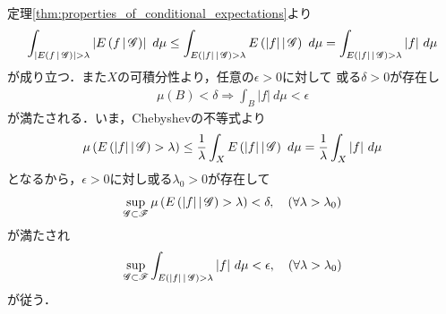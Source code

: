	\begin{prf}
		定理\ref{thm:properties_of_conditional_expectations}より
				\begin{align}
					\int_{\left| \cexp{f}{\mathscr{G}} \right| > \lambda} \left| \cexp{f}{\mathscr{G}} \right|\ d\mu
					\leq \int_{\cexp{|f|}{\mathscr{G}} > \lambda} \cexp{|f|}{\mathscr{G}}\ d\mu
					= \int_{\cexp{|f|}{\mathscr{G}} > \lambda} |f|\ d\mu
				\end{align}
				が成り立つ．また$X$の可積分性より，任意の$\epsilon > 0$に対して
				或る$\delta > 0$が存在し
				\begin{align}
					\mu(B) < \delta \Rightarrow \int_B |f|\ d\mu < \epsilon
				\end{align}
				が満たされる．いま，Chebyshevの不等式より
				\begin{align}
					\mu\left( E\left( |f| \, \middle|\, \mathscr{G} \right) > \lambda \right)
					\leq \frac{1}{\lambda} \int_X E\left( |f| \, \middle|\, \mathscr{G} \right)\ d\mu
					= \frac{1}{\lambda} \int_X |f|\ d\mu
				\end{align}
				となるから，$\epsilon > 0$に対し或る$\lambda_0 > 0$が存在して
				\begin{align}
					\operatorname*{sup}_{\mathscr{G} \subset \mathscr{F}} \mu\left( E\left( |f| \, \middle|\, \mathscr{G} \right) > \lambda \right)
					< \delta,
					\quad (\forall \lambda > \lambda_0)
				\end{align}
				が満たされ
				\begin{align}
					\operatorname*{sup}_{\mathscr{G} \subset \mathscr{F}} \int_{E\left( |f| \, \middle|\, \mathscr{G} \right) > \lambda}|f|\ d\mu
					< \epsilon,
					\quad (\forall \lambda > \lambda_0)
				\end{align}
				が従う．
		\QED
	\end{prf}